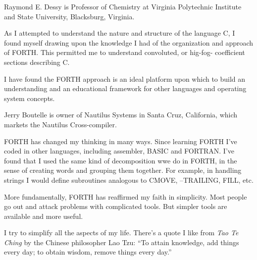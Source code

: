 Raymond E. Dessy is Professor of Chemistry at Virginia Polytechnic Institute
and State University, Blacksburg, Virginia.
\begin{tfquot}
As I attempted to understand the nature and structure of the language C, I 
found myself drawing upon the knowledge I had of the organization and
approach of FORTH.  This permitted me to understand convoluted, or hig-fog-
coefficient sections describing C.

I have found the FORTH approach is an ideal platform upon which to build
an understanding and an educational framework for other languages and
operating system concepts.
\end{tfquot}
Jerry Boutelle is owner of Nautilus Systems in Santa Cruz, California, 
which markets the Nautilus Cross-compiler.
\begin{tfquot}
FORTH has changed my thinking in many ways.  Since learning FORTH 
I've coded in other languages, including assembler, BASIC and FORTRAN.
I've found that I used the same kind of decomposition wwe do in
FORTH, in the sense of creating words and grouping them together.  For
example, in handling strings I would define subroutines analogous to
CMOVE, --TRAILING, FILL, etc.

More fundamentally, FORTH has reaffirmed my faith in simplicity.  Most 
people go out and attack problems with complicated tools.  But simpler
tools are available and more useful.

I try to simplify all the aspects of my life.  There's a quote I like from {\em Tao Te Ching}
by the Chinese philosopher Lao Tzu: ``To attain knowledge, add 
things every day; to obtain wisdom, remove things every day.''
\end{tfquot}
